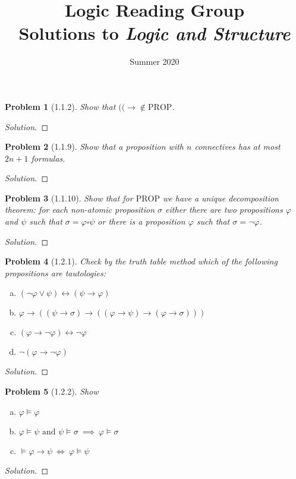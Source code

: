 \documentclass[letter]{article}
\title{Logic Reading Group\\Solutions to \textit{Logic and Structure}}
\date{Summer 2020}
\newtheorem{problem}{Problem}
\theoremstyle{definition}
\newenvironment{solution}
{\begin{proof}[Solution]}
	{\end{proof}}
\renewcommand{\phi}{\varphi}
\begin{document}
\maketitle

\newpage
\begin{problem}[1.1.2]
    Show that $(( \to \not \in \textrm{PROP}$.
\end{problem}
\begin{solution}
\end{solution}

\begin{problem}[1.1.9] Show that a proposition with $n$ connectives has at most $2n + 1$ formulas.
\end{problem}
\begin{solution}
\end{solution}

\begin{problem}[1.1.10] Show that for $\textrm{PROP}$ we have a unique decomposition theorem: for each non-atomic proposition $\sigma$ either there are two propositions $\phi$ and $\psi$ such that $\sigma = \phi \square \psi$ or there is a proposition $\phi$ such that $\sigma = \neg \phi$.
\end{problem}
\begin{solution}
\end{solution}

\begin{problem}[1.2.1] Check by the truth table method which of the following propositions are tautologies:
    \begin{enumerate}[(a)]
        \item $(\neg \phi \lor \psi) \leftrightarrow (\psi \to \phi)$
        \item $\phi \to ((\psi \to \sigma)
                          \to
                          ((\phi \to \psi)
                            \to (\phi \to \sigma)
                            ))$
        \item $(\phi \to \neg \phi) \leftrightarrow \neg \phi$
        \item $\neg (\phi \to \neg \phi)$
    \end{enumerate}
\end{problem}
\begin{solution}
\end{solution}

\begin{problem}[1.2.2] Show
    \begin{enumerate}[(a)]
        \item $\phi \models \phi$
        \item $\phi \models \psi \textrm{ and } \psi \models \sigma \> \implies \> \phi \models \sigma$
        \item $\models \phi \to \psi \> \iff \> \phi \models \psi$
    \end{enumerate}
\end{problem}
\begin{solution}
\end{solution}
\end{document}
